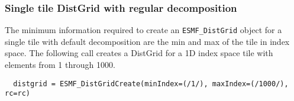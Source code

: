  
\setlength{\oldparskip}{\parskip}
\setlength{\parskip}{1.5ex}
\setlength{\oldparindent}{\parindent}
\setlength{\parindent}{0pt}
\setlength{\oldbaselineskip}{\baselineskip}
\setlength{\baselineskip}{11pt}
 
\def\bv{\begin{verbatim}}
\def\ev{\end{verbatim}}
\def\be{\begin{equation}}
\def\ee{\end{equation}}
\def\bea{\begin{eqnarray}}
\def\eea{\end{eqnarray}}
\def\bi{\begin{itemize}}
\def\ei{\end{itemize}}
\def\bn{\begin{enumerate}}
\def\en{\end{enumerate}}
\def\bd{\begin{description}}
\def\ed{\end{description}}
\def\({\left (}
\def\){\right )}
\def\[{\left [}
\def\]{\right ]}
\def\<{\left  \langle}
\def\>{\right \rangle}
\def\cI{{\cal I}}
\def\diag{\mathop{\rm diag}}
\def\tr{\mathop{\rm tr}}


 

   \subsubsection{Single tile DistGrid with regular decomposition}
   
   The minimum information required to create an {\tt ESMF\_DistGrid} object
   for a single tile with default decomposition are the min and max of the tile
   in index space. The following call creates a DistGrid for a 
   1D index space tile with elements from 1 through 1000. 

 \begin{verbatim}
  distgrid = ESMF_DistGridCreate(minIndex=(/1/), maxIndex=(/1000/), rc=rc)
 
\end{verbatim}
 
